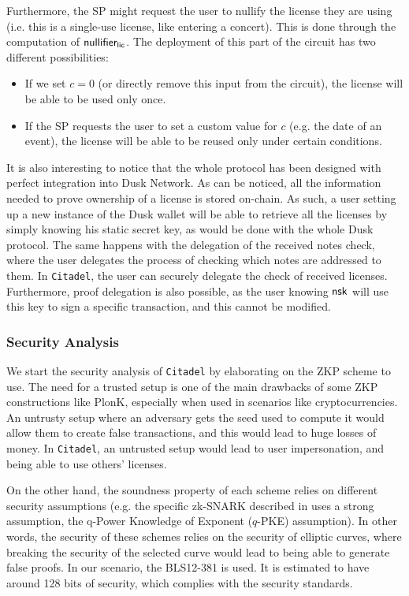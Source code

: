 Furthermore, the SP might request the user to nullify the license they are using (i.e. this is a single-use license, like entering a concert). This is done through the computation of $\mathsf{nullifier_{lic}}$. The deployment of this part of the circuit has two different possibilities:
	\begin{itemize}
		\item If we set $c = 0$ (or directly remove this input from the circuit), the license will be able to be used only once.
		\item If the SP requests the user to set a custom value for $c$ (e.g. the date of an event), the license will be able to be reused only under certain conditions.
	\end{itemize}

It is also interesting to notice that the whole protocol has been designed with perfect integration into Dusk Network. As can be noticed, all the information needed to prove ownership of a license is stored on-chain. As such, a user setting up a new instance of the Dusk wallet will be able to retrieve all the licenses by simply knowing his static secret key, as would be done with the whole Dusk protocol. The same happens with the delegation of the received notes check, where the user delegates the process of checking which notes are addressed to them. In \verb!Citadel!, the user can securely delegate the check of received licenses. Furthermore, proof delegation is also possible, as the user knowing $\mathsf{nsk}$ will use this key to sign a specific transaction, and this cannot be modified.

\subsubsection{Security Analysis}

We start the security analysis of \verb!Citadel! by elaborating on the ZKP scheme to use. The need for a trusted setup is one of the main drawbacks of some ZKP constructions like PlonK, especially when used in scenarios like cryptocurrencies. An untrusty setup where an adversary gets the seed used to compute it would allow them to create false transactions, and this would lead to huge losses of money. In \verb!Citadel!, an untrusted setup would lead to user impersonation, and being able to use others' licenses.

On the other hand, the soundness property of each scheme relies on different security assumptions \cite{assumptions} (e.g. the specific zk-SNARK described in \cite{cryptoeprint:2016:260} uses a strong assumption, the q-Power Knowledge of Exponent ($q$-PKE) assumption). In other words, the security of these schemes relies on the security of elliptic curves, where breaking the security of the selected curve would lead to being able to generate false proofs. In our scenario, the BLS12-381 \cite{zcash} is used. It is estimated to have around 128 bits of security, which complies with the security standards.

